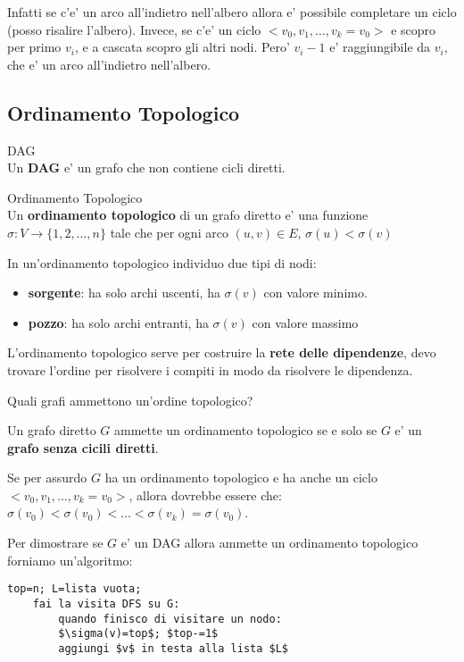 Infatti se c'e' un arco all'indietro nell'albero allora e' possibile completare un ciclo (posso risalire l'albero).
Invece, se c'e' un ciclo $<v_0, v_1, \dots, v_k=v_0>$ e scopro per primo $v_i$, e a cascata scopro gli altri nodi. Pero' $v_i-1$
e' raggiungibile da $v_i$, che e' un arco all'indietro nell'albero.

\subsection{Ordinamento Topologico}
\begin{definition} DAG \\
    Un \textbf{DAG} e' un grafo che non contiene cicli diretti.
\end{definition}

\begin{definition} Ordinamento Topologico \\
    Un \textbf{ordinamento topologico} di un grafo diretto e' una funzione $\sigma: V \to \{1,2,\dots,n\}$ tale che
    per ogni arco $(u,v) \in E$, $\sigma(u)<\sigma(v)$
\end{definition}

In un'ordinamento topologico individuo due tipi di nodi:
\begin{itemize}
    \item \textbf{sorgente}: ha solo archi uscenti, ha $\sigma(v)$ con valore minimo.
    \item \textbf{pozzo}: ha solo archi entranti, ha $\sigma(v)$ con valore massimo
\end{itemize}

L'ordinamento topologico serve per costruire la \textbf{rete delle dipendenze}, devo 
trovare l'ordine per risolvere i compiti in modo da risolvere le dipendenza.

Quali grafi ammettono un'ordine topologico?
\begin{definition}
    
    Un grafo diretto $G$ ammette un ordinamento topologico se e solo se $G$ e' un \textbf{grafo senza cicili diretti}.
\end{definition}

Se per assurdo $G$ ha un ordinamento topologico e ha anche un ciclo $<v_0,v_1,\dots,v_k=v_0>$, allora dovrebbe
essere che: $\sigma(v_0) < \sigma(v_0) < \dots < \sigma(v_k) = \sigma(v_0)$.

Per dimostrare se $G$ e' un DAG allora ammette un ordinamento topologico forniamo un'algoritmo:
\begin{lstlisting}[mathescape=true]
    top=n; L=lista vuota;
    fai la visita DFS su G:
        quando finisco di visitare un nodo:
        $\sigma(v)=top$; $top-=1$
        aggiungi $v$ in testa alla lista $L$
\end{lstlisting}

